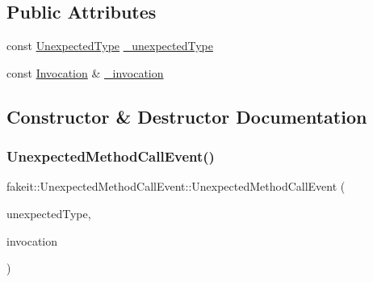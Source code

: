 \subsection*{Public Attributes}
\begin{DoxyCompactItemize}
\item 
const \mbox{\hyperlink{namespacefakeit_ae284671dc00c0fa5ee2aa4a6af02743b}{Unexpected\+Type}} \mbox{\hyperlink{structfakeit_1_1UnexpectedMethodCallEvent_a0697dbe423c830ebbb177ccdef02606c}{\+\_\+unexpected\+Type}}
\item 
const \mbox{\hyperlink{structfakeit_1_1Invocation}{Invocation}} \& \mbox{\hyperlink{structfakeit_1_1UnexpectedMethodCallEvent_a57e9ca7a92fac715dda5922f2d7ad8b2}{\+\_\+invocation}}
\end{DoxyCompactItemize}


\subsection{Constructor \& Destructor Documentation}
\mbox{\label{structfakeit_1_1UnexpectedMethodCallEvent_a57007d208f8ad119bbc5fedb744440cc}} 
\subsubsection{\texorpdfstring{UnexpectedMethodCallEvent()}{UnexpectedMethodCallEvent()}\hspace{0.1cm}{\footnotesize\ttfamily [1/9]}}
{\footnotesize\ttfamily fakeit\+::\+Unexpected\+Method\+Call\+Event\+::\+Unexpected\+Method\+Call\+Event (\begin{DoxyParamCaption}\item[{\mbox{\hyperlink{namespacefakeit_ae284671dc00c0fa5ee2aa4a6af02743b}{Unexpected\+Type}}}]{unexpected\+Type,  }\item[{const \mbox{\hyperlink{structfakeit_1_1Invocation}{Invocation}} \&}]{invocation }\end{DoxyParamCaption})\hspace{0.3cm}{\ttfamily [inline]}}

\mbox{\label{structfakeit_1_1UnexpectedMethodCallEvent_a57007d208f8ad119bbc5fedb744440cc}} 
